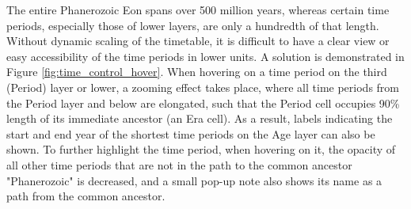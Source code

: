 \documentclass[11pt, a4paper,oneside,chapterprefix=false]{scrbook}
\begin{document}
The entire Phanerozoic Eon spans over 500 million years, whereas certain time periods, especially those of lower layers, are only a hundredth of that length. Without dynamic scaling of the timetable, it is difficult to have a clear view or easy accessibility of the time periods in lower units. A solution is demonstrated in Figure \ref{fig:time_control_hover}. When hovering on a time period on the third (Period) layer or lower, a zooming effect takes place, where all time periods from the Period layer and below are elongated, such that the Period cell occupies 90\% length of its immediate ancestor (an Era cell). As a result, labels indicating the start and end year of the shortest time periods on the Age layer can also be shown. To further highlight the time period, when hovering on it, the opacity of all other time periods that are not in the path to the common ancestor "Phanerozoic" is decreased, and a small pop-up note also shows its name as a path from the common ancestor. \\
\end{document}
